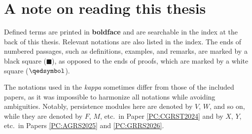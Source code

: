 \section*{A note on reading this thesis}

Defined terms are printed in \textbf{boldface} and are searchable in the index at the back of this thesis. Relevant notations are also listed in the index. The ends of numbered passages, such as definitions, examples, and remarks, are marked by a black square ($\mdlgblksquare$), as opposed to the ends of proofs, which are marked by a white square ($\qedsymbol$).

The notations used in the \textit{kappa} sometimes differ from those of the included papers, as it was impossible to harmonize all notations while avoiding ambiguities. Notably, persistence modules here are denoted by $V$, $W$, and so on, while they are denoted by $F$, $M$, etc.\ in Paper \ref{PC:CGRST2024} and by $X$, $Y$, etc.\ in Papers \ref{PC:AGRS2025} and \ref{PC:GRRS2026}.